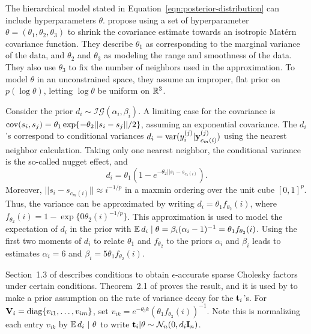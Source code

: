 \documentclass[letterpaper]{article}
\begin{document}
  The hierarchical model stated in Equation~\eqref{eqn:posterior-distribution}
  can include hyperparameters $\theta$. \citet{Kidd2021} propose using a set
  of hyperparameter $\theta = (\theta_{1}, \theta_{2}, \theta_{3})$ to shrink
  the covariance estimate towards an isotropic Mat\'{e}rn covariance function.
  They describe $\theta_1$ as corresponding to the marginal variance of the data,
  and $\theta_2$ and $\theta_3$ as modeling the range and smoothness of the data.
  They also use $\theta_3$ to fix the number of neighbors used in the approximation.
  To model $\theta$ in an unconstrained space, they assume an improper, flat prior
  on $p(\log \theta)$, letting $\log \theta$ be uniform on $\mathbb{R}^{3}$.

  Consider the prior $d_{i} \sim \mathcal{IG}(\alpha_{i}, \beta_{i})$. A limiting
  case for the covariance is $\operatorname{\mathrm{cov}}(s_i, s_j) = \theta_{1}\exp\{-\theta_{2}||s_{i}-s_{j}||/2\}$,
  assuming an exponential covariance. The $d_{i}$'s correspond to conditional
  variances $d_{i} = \operatorname{\mathrm{var}}(y_{i}^{(j)} | \mathbf{y}_{c_m(i)}^{(j)})$ using the nearest
  neighbor calculation. Taking only one nearest neighbor, the conditional variance
  is the so-called nugget effect, and
  \begin{equation*}
    d_{i} = \theta_{1}\left(1 - e^{-\theta_{2}||s_{i} - s_{c_{1}(i)}}\right).
  \end{equation*}
  Moreover, $||s_{i} - s_{c_m(i)}|| \approx i^{-1/p}$ in a maxmin ordering over
  the unit cube $[0, 1]^{p}$. Thus, the variance can be approximated by
  writing $d_{i} = \theta_{1}f_{\theta_{2}}(i)$, where
  $f_{\theta_2}(i) = 1 - \exp\{0\theta_{2}(i)^{-1/p}\}$.
  This approximation is used to model the expectation of $d_{i}$ in the prior
  with $\operatorname{\mathbb{E}} d_{i}\; |\; \theta = \beta_{i}(\alpha_{i} - 1)^{-1} = \theta_{1}f_{\theta_{2}}(i)$.
  Using the first two moments of $d_{i}$ to relate $\theta_{1}$ and $f_{\theta_{2}}$
  to the priors $\alpha_{i}$ and $\beta_{i}$ leads to estimates $\alpha_{i} = 6$
  and $\beta_{i} = 5\theta_{1}f_{\theta_{2}}(i)$.

  Section~1.3 of \citet{Schafer2021a} describes conditions to obtain
  $\epsilon$-accurate sparse Cholesky factors under certain conditions. Theorem~2.1
  of \citet{Schafer2021a} proves the result, and it is used by \citet{Kidd2021}
  to make a prior assumption on the rate of variance decay for the $\mathbf{t}_{i}$'s.
  For $\mathbf{V}_{i} = \text{diag}\{v_{i1}, \dots, v_{im}\}$, set
  $v_{ik} = e^{-\theta_{3} k}(\theta_{1}f_{\theta_{2}}(i))^{-1}$. Note this is
  normalizing each entry $v_{ik}$ by $\operatorname{\mathbb{E}} d_{i}\ |\ \theta$ to write
  $\mathbf{t}_{i} | \theta \sim \mathcal{N}_{n}(0, d_{i}\mathbf{I}_{n})$.
\end{document}
